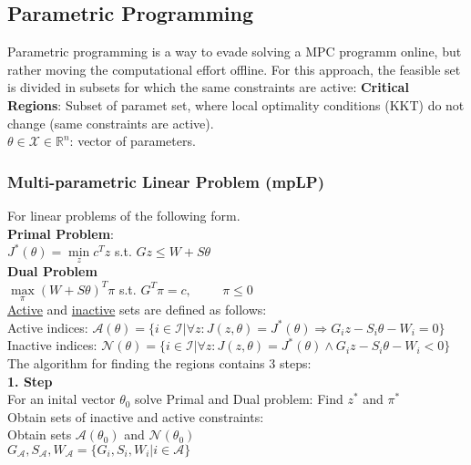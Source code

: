 \documentclass[10pt,parskip]{scrartcl}
\begin{document}
\begin{multicols*}{3}
\subsection{Parametric Programming}
Parametric programming is a way to evade solving a MPC programm online, but rather moving the computational effort offline. For this approach, the feasible set is divided in subsets for which the same constraints are active: \textbf{Critical Regions}:
Subset of paramet set, where local optimality conditions (KKT) do not change (same constraints are active).\\
\hspace*{5mm}$ \theta \in \mathcal X \in \mathbb R^n$: vector of parameters.


\subsubsection{Multi-parametric Linear Problem (mpLP)}
For linear problems of the following form. \\
\textbf{Primal Problem}:\\
$J^*(\theta) = \min\limits_{z} c^T z$ \hspace{1cm} s.t. $Gz \leq W+S \theta$\\
\textbf{Dual Problem}\\
$\max\limits_{\pi} (W + S \theta)^T \pi$ \hspace{1cm} s.t. $G^T \pi = c, \hspace{1cm} \pi \leq 0$\\
\underline{Active} and \underline{inactive} sets are defined as follows:\\
Active indices: $\mathcal{A}(\theta) = \{ i \in \mathcal{I} | \forall z : J(z, \theta) = J^*(\theta) \Rightarrow G_i z - S_i \theta - W_i = 0 \}$\\
Inactive indices: $\mathcal{N}(\theta) = \{ i \in \mathcal{I} | \forall z : J(z, \theta) = J^*(\theta) \wedge G_i z - S_i \theta - W_i < 0 \}$\\
The algorithm for finding the regions contains 3 steps:\\
\textbf{1. Step}\\
For an inital vector $\theta_0$ solve Primal and Dual problem: Find $z^*$ and $\pi^*$\\
Obtain sets of inactive and active constraints:\\
Obtain sets $\mathcal{A}(\theta_0)$ and $\mathcal{N}(\theta_0)$\\
$G_{\mathcal{A}}, S_{\mathcal{A}}, W_{\mathcal{A}}=\{G_i, S_i, W_i | i \in {\mathcal{A}} \}$\\

\end{multicols*}
\end{document}
